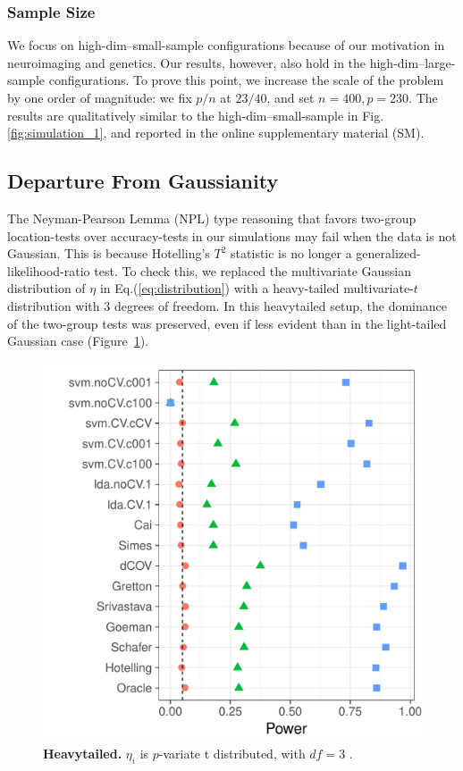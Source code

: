 \documentclass[]{bio}
\begin{document}
\subsubsection{Sample Size}
We focus on high-dim--small-sample configurations because of our motivation in neuroimaging and genetics. 
Our results, however, also  hold in the high-dim--large-sample configurations.
To prove this point, we increase the scale of the problem by one order of magnitude: we fix $p/n$ at $23/40$, and set $n=400, p=230$. 
The results are qualitatively similar to the high-dim--small-sample in Fig.\ref{fig:simulation_1}, and reported in the online supplementary material (SM).


\subsection{Departure From Gaussianity}
\label{sec:heavytailed}
The Neyman-Pearson Lemma (NPL) type reasoning that favors two-group location-tests over accuracy-tests in our simulations may fail when the data is not Gaussian.
This is because Hotelling's $T^2$ statistic is no longer a generalized-likelihood-ratio test. 
To check this, we replaced the multivariate Gaussian distribution of $\eta$ in Eq.(\ref{eq:distribution}) with a heavy-tailed multivariate-$t$ distribution with $3$ degrees of freedom.
In this heavytailed setup, the dominance of the two-group tests was preserved, even if less evident than in the light-tailed Gaussian case (Figure~\ref{fig:t_null}).

\begin{figure}[th]
	\centering
	\includegraphics[width=0.5\columnwidth]{"art/file9"}
	\caption{\textbf{Heavytailed.} $\eta_i$ is $p$-variate t distributed, with $df=3$ .  } 
	\label{fig:t_null}
\end{figure}




\end{document}
